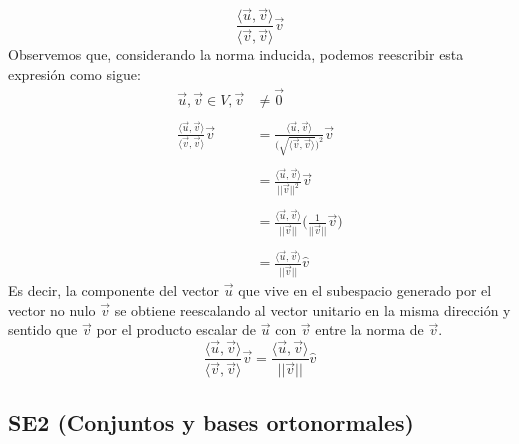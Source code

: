 \documentclass[12pt,dvipsnames]{article}
\numberwithin{equation}{section}
\begin{document}
\[
\frac{\langle \vec{u} , \vec{v} \rangle}{\langle \vec{v} , \vec{v} \rangle} \vec{v} 
\] 
Observemos que, considerando la norma inducida, podemos reescribir esta expresión como sigue:
\begin{align*}
    \vec{u},\vec{v}\in V, \vec{v}&\neq \vec{0} \\ \\
    \frac{\langle \vec{u} , \vec{v} \rangle}{\langle \vec{v} , \vec{v} \rangle} \vec{v} &= \frac{\langle \vec{u} , \vec{v} \rangle}{\big(\sqrt{\langle \vec{v} , \vec{v} \rangle}\big)^2} \vec{v} \\ \\
                                                                                        &= \frac{\langle \vec{u} , \vec{v} \rangle}{||\vec{v}||^2} \vec{v} \\ \\
                                                                                        &= \frac{\langle \vec{u} , \vec{v} \rangle}{||\vec{v}||} \bigg( \frac{1}{||\vec{v}||} \vec{v} \bigg) \\ \\
                                                                                        &= \frac{\langle \vec{u} , \vec{v} \rangle}{||\vec{v}||} \hat{v}
\end{align*}
Es decir, la componente del vector $\vec{u}$ que vive en el subespacio generado por el vector no nulo $\vec{v}$ se obtiene reescalando al vector unitario en la misma dirección y sentido que $\vec{v}$ por el producto escalar de $\vec{u}$ con $\vec{v}$ entre la norma de $\vec{v}$.
\[
    \frac{\langle \vec{u} , \vec{v} \rangle}{\langle \vec{v} , \vec{v} \rangle} \vec{v} = \frac{\langle \vec{u} , \vec{v} \rangle}{||\vec{v}||} \hat{v}
\] 

\subsection{SE2 (Conjuntos y bases ortonormales)}
\end{document}
